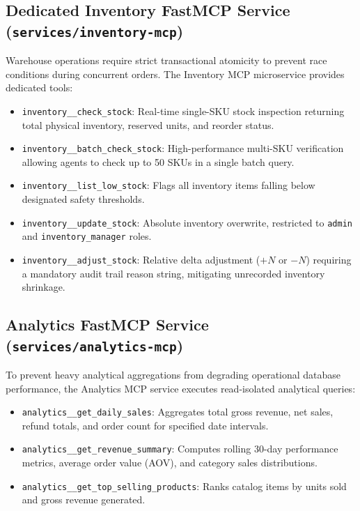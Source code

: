 \documentclass[11pt,a4paper]{article}
\begin{document}
\subsection{Dedicated Inventory FastMCP Service (\texttt{services/inventory-mcp})}
Warehouse operations require strict transactional atomicity to prevent race conditions during concurrent orders. The Inventory MCP microservice provides dedicated tools:
\begin{itemize}[leftmargin=*]
    \item \texttt{inventory\_\_check\_stock}: Real-time single-SKU stock inspection returning total physical inventory, reserved units, and reorder status.
    \item \texttt{inventory\_\_batch\_check\_stock}: High-performance multi-SKU verification allowing agents to check up to 50 SKUs in a single batch query.
    \item \texttt{inventory\_\_list\_low\_stock}: Flags all inventory items falling below designated safety thresholds.
    \item \texttt{inventory\_\_update\_stock}: Absolute inventory overwrite, restricted to \texttt{admin} and \texttt{inventory\_manager} roles.
    \item \texttt{inventory\_\_adjust\_stock}: Relative delta adjustment ($+N$ or $-N$) requiring a mandatory audit trail reason string, mitigating unrecorded inventory shrinkage.
\end{itemize}

\subsection{Analytics FastMCP Service (\texttt{services/analytics-mcp})}
To prevent heavy analytical aggregations from degrading operational database performance, the Analytics MCP service executes read-isolated analytical queries:
\begin{itemize}[leftmargin=*]
    \item \texttt{analytics\_\_get\_daily\_sales}: Aggregates total gross revenue, net sales, refund totals, and order count for specified date intervals.
    \item \texttt{analytics\_\_get\_revenue\_summary}: Computes rolling 30-day performance metrics, average order value (AOV), and category sales distributions.
    \item \texttt{analytics\_\_get\_top\_selling\_products}: Ranks catalog items by units sold and gross revenue generated.
\end{itemize}
\end{document}
